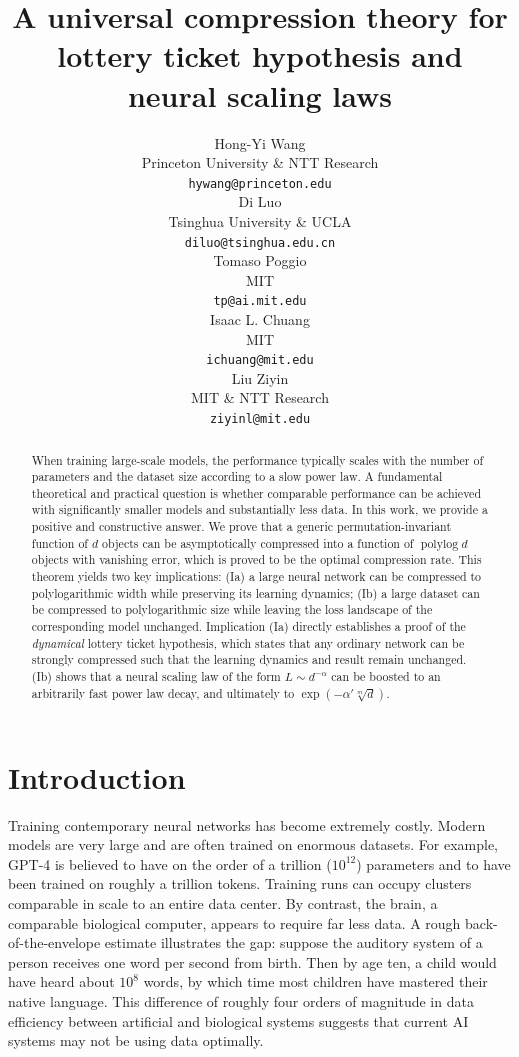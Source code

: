 \documentclass{article}
\title{A universal compression theory for lottery ticket hypothesis and neural scaling laws}
\author{Hong-Yi Wang \\
Princeton University \& NTT Research \\   
\texttt{hywang@princeton.edu} \\
\And 
Di Luo \\
Tsinghua University \& UCLA\\
\texttt{diluo@tsinghua.edu.cn} \\
\AND
Tomaso Poggio \\
MIT\\
\texttt{tp@ai.mit.edu} \\
\And
Isaac L. Chuang \\
MIT\\
\texttt{ichuang@mit.edu} \\
\And
Liu Ziyin \\
MIT \& NTT Research \\
\texttt{ziyinl@mit.edu}
}
\theoremstyle{plain}
\begin{document}


\maketitle

\begin{abstract}
\vspace{-2mm}
    When training large-scale models, the performance typically scales with the number of parameters and the dataset size according to a slow power law. A fundamental theoretical and practical question is whether comparable performance can be achieved with significantly smaller models and substantially less data. In this work, we provide a positive and constructive answer. We prove that a generic permutation-invariant function of $d$ objects can be asymptotically compressed into a function of $\operatorname{polylog} d$ objects with vanishing error, which is proved to be the optimal compression rate. This theorem yields two key implications: (Ia) a large neural network can be compressed to polylogarithmic width while preserving its learning dynamics; (Ib) a large dataset can be compressed to polylogarithmic size while leaving the loss landscape of the corresponding model unchanged. Implication (Ia) directly establishes a proof of the \textit{dynamical} lottery ticket hypothesis, which states that any ordinary network can be strongly compressed such that the learning dynamics and result remain unchanged. (Ib) shows that a neural scaling law of the form $L\sim d^{-\alpha}$ can be boosted to an arbitrarily fast power law decay, and ultimately to $\exp(-\alpha' \sqrt[m]{d})$.
\end{abstract}


\vspace{-2mm}
\section{Introduction}
\vspace{-1mm}

Training contemporary neural networks has become extremely costly. Modern models are very large and are often trained on enormous datasets. For example, GPT-4 is believed to have on the order of a trillion ($10^{12}$) parameters and to have been trained on roughly a trillion tokens. Training runs can occupy clusters comparable in scale to an entire data center. By contrast, the brain, a comparable biological computer, appears to require far less data. A rough back-of-the-envelope estimate illustrates the gap: suppose the auditory system of a person receives one word per second from birth. Then by age ten, a child would have heard about $10^8$ words, by which time most children have mastered their native language. This difference of roughly four orders of magnitude in data efficiency between artificial and biological systems suggests that current AI systems may not be using data optimally.
\end{document}
